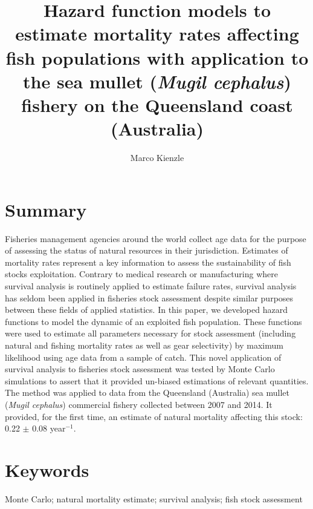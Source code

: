 \documentclass[12pt]{article}
\begin{document}
\linenumbers


\setlength{\textheight}{575pt}
\setlength{\baselineskip}{23pt}


\title{Hazard function models to estimate mortality rates affecting fish populations with application to the sea mullet ({\it Mugil cephalus}) fishery on the Queensland coast (Australia)}

\author{Marco Kienzle}

\maketitle

\section*{Summary}

Fisheries management agencies around the world collect age data for the purpose of assessing the status of natural resources in their jurisdiction. Estimates of mortality rates represent a key information to assess the sustainability of fish stocks exploitation. Contrary to medical research or manufacturing where survival analysis is routinely applied to estimate failure rates, survival analysis has seldom been applied in fisheries stock assessment despite similar purposes between these fields of applied statistics. In this paper, we developed hazard functions to model the dynamic of an exploited fish population. These functions were used to estimate all parameters necessary for stock assessment (including natural and fishing mortality rates as well as gear selectivity) by maximum likelihood using age data from a sample of catch. This novel application of survival analysis to fisheries stock assessment was tested by Monte Carlo simulations to assert that it provided un-biased estimations of relevant quantities. The method was applied to data from the Queensland (Australia) sea mullet ({\it Mugil cephalus}) commercial fishery collected between 2007 and 2014. It provided, for the first time, an estimate of natural mortality affecting this stock: 0.22 $\pm$ 0.08 year$^{-1}$.

\section*{Keywords}
Monte Carlo; natural mortality estimate; survival analysis; fish stock assessment
\end{document}
